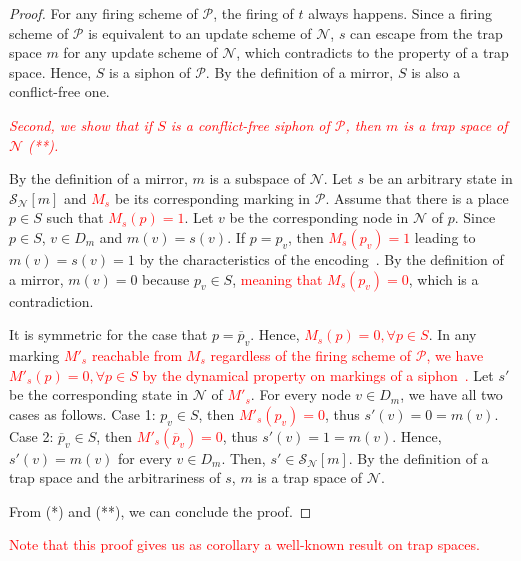 \documentclass[preprint,12pt]{elsarticle}
\newcommand{\change}[1]{\textcolor{red}{#1}}
\begin{document}
\begin{proof}
  For any firing scheme of \(\mathcal{P}\), the firing of \(t\) always happens.
  Since a firing scheme of \(\mathcal{P}\) is equivalent to an update scheme of \(\mathcal{N}\), \(s\) can escape from the trap space \(m\) for any update scheme of \(\mathcal{N}\), which contradicts to the property of a trap space.
  Hence, \(S\) is a siphon of \(\mathcal{P}\).
  By the definition of a mirror, \(S\) is also a conflict-free one.

  \change{\textit{Second, we show that if \(S\) is a conflict-free siphon of \(\mathcal{P}\), then \(m\) is a trap space of \(\mathcal{N}\) (**).}}

  By the definition of a mirror, \(m\) is a subspace of \(\mathcal{N}\).
  Let \(s\) be an arbitrary state in \(\mathcal{S}_{\mathcal{N}}[m]\) and \change{\(M_s\)} be its corresponding marking in \(\mathcal{P}\).
  Assume that there is a place \(p \in S\) such that \change{\(M_s(p) = 1\)}.
  Let \(v\) be the corresponding node in \(\mathcal{N}\) of \(p\).
  Since \(p \in S\), \(v \in D_m\) and \(m(v) = s(v)\).
  If \(p = p_{v}\), then \change{\(M_s(p_{v}) = 1\)} leading to \(m(v) = s(v) = 1\) by the characteristics of the encoding~\cite{chaouiya2004qualitative}.
  By the definition of a mirror, \(m(v) = 0\) because \(p_{v} \in S\), \change{meaning that \(M_s(p_{v}) = 0\)}, which is a contradiction.

  It is symmetric for the case that \(p = \overline{p}_{v}\).
  Hence, \change{\(M_s(p) = 0, \forall p \in S\)}.
  In any marking \change{\(M'_s\) reachable from \(M_s\) regardless of the firing scheme of \(\mathcal{P}\), we have \(M'_s(p) = 0, \forall p \in S\) by the dynamical property on markings of a siphon~\cite{DBLP:journals/isci/LiuB16}.}
  Let \(s'\) be the corresponding state in \(\mathcal{N}\) of \change{\(M'_s\)}.
  For every node \(v \in D_m\), we have all two cases as follows.
  Case 1: \(p_v \in S\), then \change{\(M'_s(p_v) = 0\)}, thus \(s'(v) = 0 = m(v)\).
  Case 2: \(\overline{p}_v \in S\), then \change{\(M'_s(\overline{p}_v) = 0\)}, thus \(s'(v) = 1 = m(v)\).
  Hence, \(s'(v) = m(v)\) for every \(v \in D_m\).
  Then, \(s' \in \mathcal{S}_{\mathcal{N}}[m]\).
  By the definition of a trap space and the arbitrariness of \(s\), \(m\) is a trap space of \(\mathcal{N}\).

  From (*) and (**), we can conclude the proof.
\end{proof}

\change{Note that this proof gives us as corollary a well-known result on trap spaces.}
\end{document}
